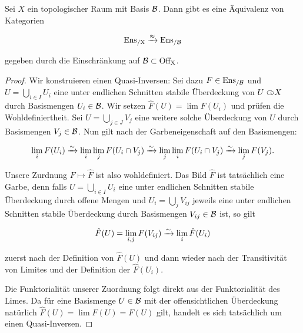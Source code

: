 \begin{satz}
  Sei $X$ ein topologischer Raum mit Basis $\mathcal{B}$. Dann gibt es eine
  Äquivalenz von Kategorien

  \[ \operatorname{Ens_{/X}} \xrightarrow{\approx} \operatorname{Ens_{/\mathcal{B}}} \]

  gegeben durch die Einschränkung auf $\mathcal{B} \subset \operatorname{Off_X}$.
\end{satz}
\begin{proof}
  Wir konstruieren einen Quasi-Inversen: Sei dazu $F \in \operatorname{Ens_{/\mathcal{B}}}$ und $U
  = \bigcup_{i \in I} U_i$ eine unter endlichen Schnitten stabile
  Überdeckung von $U \subset\kern-0.58em\circ X$ durch Basismengen $U_i \in \mathcal{B}$. Wir
  setzen $\hat{F}(U) = \lim F(U_i)$ und prüfen die
  Wohldefiniertheit. Sei $U = \bigcup_{j \in J} V_j$ eine weitere
  solche Überdeckung von $U$ durch Basismengen $V_j \in \mathcal{B}$. Nun gilt
  nach der Garbeneigenschaft auf den Basismengen:

  \[ \lim_i F(U_i)
  \xrightarrow[]{\sim} \lim_i \lim_j F(U_i \cap V_j)
  \xrightarrow[]{\sim} \lim_j \lim_i F(U_i \cap V_j)
  \xrightarrow[]{\sim} \lim_j F(V_j) .\]

  Unsere Zurdnung $F \mapsto \hat{F}$ ist also wohldefiniert. Das Bild
  $\hat{F}$ ist tatsächlich eine Garbe, denn falls $U = \bigcup_{i \in
    I} U_i$ eine unter endlichen Schnitten stabile Überdeckung durch
  offene Mengen und $U_i = \bigcup_{j} V_{ij}$ jeweils eine unter endlichen
  Schnitten stabile Überdeckung durch Basismengen $V_{ij} \in \mathcal{B}$ ist,
  so gilt

  \[ \hat{F}(U) = \lim_{i,j} F(V_{ij}) \xrightarrow[]{\sim} \lim_i \hat{F}(U_i) \]

  zuerst nach der Definition von $\hat{F}(U)$ und dann wieder nach der
  Transitivität von Limites und der Definition der $\hat{F}(U_i)$.
  
  Die Funktorialität unserer Zuordnung folgt direkt aus der
  Funktorialität des Limes. Da für eine Basismenge $U \in \mathcal{B}$ mit der
  offensichtlichen Überdeckung natürlich $\hat{F}(U) = \lim F(U) =
  F(U) $ gilt, handelt es sich tatsächlich um einen Quasi-Inversen.
\end{proof}

